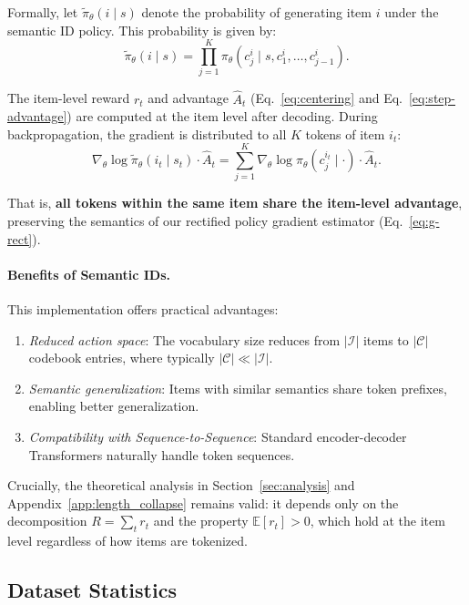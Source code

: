 \documentclass{llmxive}
\begin{document}
Formally, let $\tilde{\pi}_\theta(i \mid s)$ denote the probability of generating item $i$ under the semantic ID policy. This probability is given by:
\begin{equation}
\label{eq:semantic_id_prob}
\tilde{\pi}_\theta(i \mid s) = \prod_{j=1}^{K} \pi_\theta(c_j^i \mid s, c_1^i, \ldots, c_{j-1}^i).
\end{equation}

The item-level reward $r_t$ and advantage $\hat{A}_t$ (Eq.~\eqref{eq:centering} and Eq.~\eqref{eq:step-advantage}) are computed at the item level after decoding. During backpropagation, the gradient is distributed to all $K$ tokens of item $i_t$:
\begin{equation}
\label{eq:gradient_distribution}
\nabla_\theta \log \tilde{\pi}_\theta(i_t \mid s_t) \cdot \hat{A}_t = \sum_{j=1}^{K} \nabla_\theta \log \pi_\theta(c_j^{i_t} \mid \cdot) \cdot \hat{A}_t.
\end{equation}

That is, \textbf{all tokens within the same item share the item-level advantage}, preserving the semantics of our rectified policy gradient estimator (Eq.~\eqref{eq:g-rect}).

\paragraph{Benefits of Semantic IDs.} This implementation offers practical advantages:
\begin{enumerate}
    \item \textit{Reduced action space}: The vocabulary size reduces from $|\mathcal{I}|$ items to $|\mathcal{C}|$ codebook entries, where typically $|\mathcal{C}| \ll |\mathcal{I}|$.
    \item \textit{Semantic generalization}: Items with similar semantics share token prefixes, enabling better generalization.
    \item \textit{Compatibility with Sequence-to-Sequence}: Standard encoder-decoder Transformers naturally handle token sequences.
\end{enumerate}

Crucially, the theoretical analysis in Section~\ref{sec:analysis} and Appendix~\ref{app:length_collapse} remains valid: it depends only on the decomposition $R = \sum_t r_t$ and the property $\mathbb{E}[r_t] > 0$, which hold at the item level regardless of how items are tokenized.


\subsection{Dataset Statistics}
\label{app:dataset}
\end{document}
